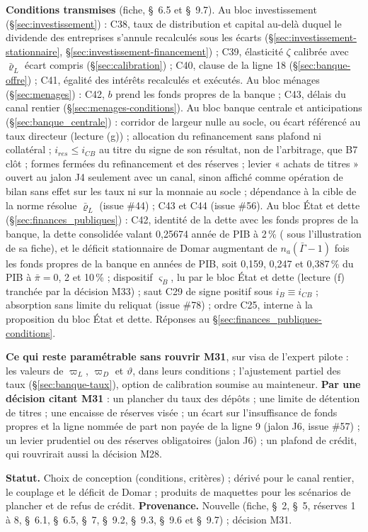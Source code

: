 \documentclass[11pt,a4paper]{article}
\newcommand{\barre}[1]{\leavevmode\sbox{\boitebarre}{#1}\rlap{\rule[0.6ex]{\wd\boitebarre}{0.4pt}}\usebox{\boitebarre}}
\begin{document}
\begin{proposee}
\textbf{Conditions transmises} (fiche, \S~6.5 et \S~9.7). Au bloc investissement (\S\ref{sec:investissement}) : C38, taux de distribution et capital au-delà duquel le dividende des entreprises s'annule recalculés sous les écarts (\S\ref{sec:investissement-stationnaire}, \S\ref{sec:investissement-financement}) ; C39, élasticité $\zeta$ calibrée avec $\bar\varrho_L$ écart compris (\S\ref{sec:calibration}) ; C40, clause de la ligne 18 (\S\ref{sec:banque-offre}) ; C41, égalité des intérêts recalculés et exécutés. Au bloc ménages (\S\ref{sec:menages}) : C42, $b$ prend les fonds propres de la banque ; C43, délais du canal rentier (\S\ref{sec:menages-conditions}). Au bloc banque centrale et anticipations (\S\ref{sec:banque_centrale}) : corridor de largeur nulle au socle, ou écart référencé au taux directeur (lecture (g)) ; allocation du refinancement sans plafond ni collatéral ; $i_{\mathit{res}} \le i_{\mathit{CB}}$ au titre du signe de son résultat, non de l'arbitrage, que B7 clôt ; formes fermées du refinancement et des réserves ; levier « achats de titres » ouvert au jalon J4 seulement avec un canal, sinon affiché comme opération de bilan sans effet sur les taux ni sur la monnaie au socle ; dépendance à la cible de la norme résolue $\bar\varrho_L$ (issue \#44) ; C43 et C44 (issue \#56). Au bloc État et dette (\S\ref{sec:finances_publiques}) : C42, identité de la dette avec les fonds propres de la banque, la dette consolidée valant 0,25674 année de PIB à 2\,\% (\barre{0,30622} sous l'illustration de sa fiche), et le déficit stationnaire de Domar augmentant de $n_a(\bar\Gamma - 1)$ fois les fonds propres de la banque en années de PIB, soit 0,159, 0,247 et 0,387\,\% du PIB à $\bar\pi = 0$, 2 et 10\,\% ; dispositif $\varsigma_B$, lu par le bloc État et dette (lecture (f) tranchée par la décision M33) ; saut C29 de signe positif sous $i_B \equiv i_{\mathit{CB}}$ ; absorption sans limite du reliquat (issue \#78) ; ordre C25, interne à la proposition du bloc État et dette. Réponses au \S\ref{sec:finances_publiques-conditions}.

\textbf{Ce qui reste paramétrable sans rouvrir M31}, sur visa de l'expert pilote : les valeurs de $\varpi_L$, $\varpi_D$ et $\vartheta$, dans leurs conditions ; l'ajustement partiel des taux (\S\ref{sec:banque-taux}), option de calibration soumise au mainteneur. \textbf{Par une décision citant M31} : un plancher du taux des dépôts ; une limite de détention de titres ; une encaisse de réserves visée ; un écart sur l'insuffisance de fonds propres et la ligne nommée de part non payée de la ligne 9 (jalon J6, issue \#57) ; un levier prudentiel ou des réserves obligatoires (jalon J6) ; un plafond de crédit, qui rouvrirait aussi la décision M28.

\textbf{Statut.} Choix de conception (conditions, critères) ; dérivé pour le canal rentier, le couplage et le déficit de Domar ; produits de maquettes pour les scénarios de plancher et de refus de crédit. \textbf{Provenance.} Nouvelle (fiche, \S~2, \S~5, réserves 1 à 8, \S~6.1, \S~6.5, \S~7, \S~9.2, \S~9.3, \S~9.6 et \S~9.7) ; décision M31.
\end{proposee}
\end{document}
